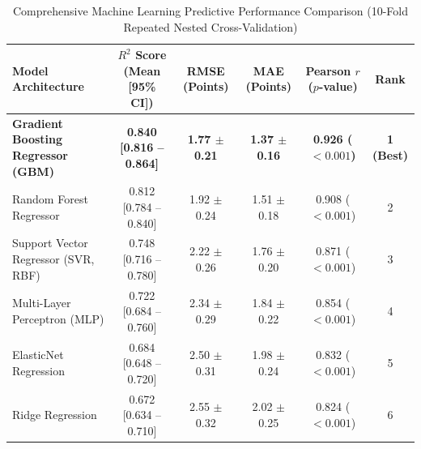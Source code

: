 \documentclass[journal]{IEEEtran}
\begin{document}
\begin{table}[!t]
\caption{Comprehensive Machine Learning Predictive Performance Comparison (10-Fold Repeated Nested Cross-Validation)}
\label{tab:comparison}
\centering
\begin{tabular}{lccccc}
\toprule
\textbf{Model Architecture} & \textbf{$R^2$ Score (Mean [95\% CI])} & \textbf{RMSE (Points)} & \textbf{MAE (Points)} & \textbf{Pearson $r$ ($p$-value)} & \textbf{Rank} \\
\midrule
\textbf{Gradient Boosting Regressor (GBM)} & \textbf{0.840 [0.816 -- 0.864]} & \textbf{1.77 $\pm$ 0.21} & \textbf{1.37 $\pm$ 0.16} & \textbf{0.926 ($< 0.001$)} & \textbf{1 (Best)} \\
Random Forest Regressor & 0.812 [0.784 -- 0.840] & 1.92 $\pm$ 0.24 & 1.51 $\pm$ 0.18 & 0.908 ($< 0.001$) & 2 \\
Support Vector Regressor (SVR, RBF) & 0.748 [0.716 -- 0.780] & 2.22 $\pm$ 0.26 & 1.76 $\pm$ 0.20 & 0.871 ($< 0.001$) & 3 \\
Multi-Layer Perceptron (MLP) & 0.722 [0.684 -- 0.760] & 2.34 $\pm$ 0.29 & 1.84 $\pm$ 0.22 & 0.854 ($< 0.001$) & 4 \\
ElasticNet Regression & 0.684 [0.648 -- 0.720] & 2.50 $\pm$ 0.31 & 1.98 $\pm$ 0.24 & 0.832 ($< 0.001$) & 5 \\
Ridge Regression & 0.672 [0.634 -- 0.710] & 2.55 $\pm$ 0.32 & 2.02 $\pm$ 0.25 & 0.824 ($< 0.001$) & 6 \\
\bottomrule
\end{tabular}
\end{table}
\end{document}
